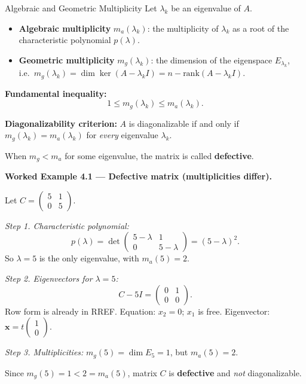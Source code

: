 \documentclass[12pt,a4paper]{article}
\begin{document}
\begin{infobox}{Algebraic and Geometric Multiplicity}
Let $\lambda_k$ be an eigenvalue of $A$.

\begin{itemize}
  \item \textbf{Algebraic multiplicity} $m_a(\lambda_k)$: the multiplicity of $\lambda_k$ as a root
        of the characteristic polynomial $p(\lambda)$.
  \item \textbf{Geometric multiplicity} $m_g(\lambda_k)$: the dimension of the eigenspace $E_{\lambda_k}$,
        i.e.\ $m_g(\lambda_k) = \dim\ker(A - \lambda_k I) = n - \text{rank}(A - \lambda_k I)$.
\end{itemize}

\textbf{Fundamental inequality:}
\[
  1 \leq m_g(\lambda_k) \leq m_a(\lambda_k).
\]

\textbf{Diagonalizability criterion:} $A$ is diagonalizable if and only if
$m_g(\lambda_k) = m_a(\lambda_k)$ for \emph{every} eigenvalue $\lambda_k$.

When $m_g < m_a$ for some eigenvalue, the matrix is called \textbf{defective}.
\end{infobox}

\textbf{Worked Example 4.1 --- Defective matrix (multiplicities differ).}

Let $C = \begin{pmatrix} 5 & 1 \\ 0 & 5 \end{pmatrix}$.

\textit{Step 1. Characteristic polynomial:}
\[
  p(\lambda) = \det\begin{pmatrix} 5-\lambda & 1 \\ 0 & 5-\lambda \end{pmatrix}
  = (5-\lambda)^2.
\]
So $\lambda = 5$ is the only eigenvalue, with $m_a(5) = 2$.

\textit{Step 2. Eigenvectors for $\lambda = 5$:}
\[
  C - 5I = \begin{pmatrix} 0 & 1 \\ 0 & 0 \end{pmatrix}.
\]
Row form is already in RREF. Equation: $x_2 = 0$; $x_1$ is free.
Eigenvector: $\mathbf{x} = t\begin{pmatrix}1\\0\end{pmatrix}$.

\textit{Step 3. Multiplicities:}
$m_g(5) = \dim E_5 = 1$, but $m_a(5) = 2$.

Since $m_g(5) = 1 < 2 = m_a(5)$, matrix $C$ is \textbf{defective} and \emph{not} diagonalizable.
\end{document}
